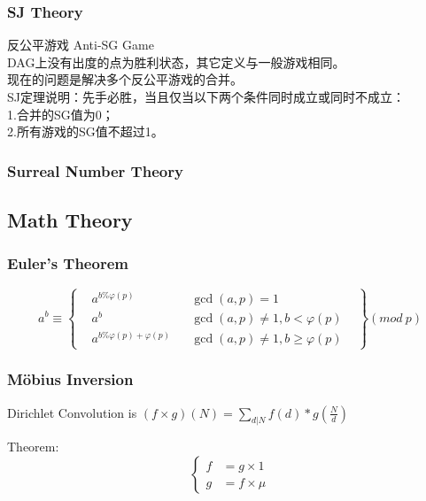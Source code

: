 \documentclass[10pt]{ctexart}
\begin{document}
{{\subsubsection{SJ Theory}
反公平游戏 Anti-SG Game\\
DAG上没有出度的点为胜利状态，其它定义与一般游戏相同。\\
现在的问题是解决多个反公平游戏的合并。\\
SJ定理说明：先手必胜，当且仅当以下两个条件同时成立或同时不成立：\\
1.合并的SG值为0；\\
2.所有游戏的SG值不超过1。\\
\subsubsection{Surreal Number Theory}

\subsection{Math Theory}
\subsubsection{Euler's Theorem}
\begin{equation*}
    a^b\equiv\left\{
    \begin{aligned}
    &a^{b\%\varphi(p)} & & \gcd(a,p)=1&\\
    &a^b & &\gcd(a,p)\not=1,b<\varphi(p) \\
    &a^{b\%\varphi(p) + \varphi(p)} & & \gcd(a,p)\not=1,b\geq \varphi(p) &
    \end{aligned}
    \right\}
    (mod\ p)
\end{equation*}
\subsubsection{Möbius Inversion}
{
Dirichlet Convolution is $(f\times g)(N)=\sum_{d|N} f(d) * g(\frac{N}{d})$
\par
Theorem:
\begin{equation*}
    \left\{
        \begin{aligned} 
            f &= g \times 1 \\
            g &= f \times \mu
        \end{aligned} 
    \right. 
\end{equation*}
}

}}
\end{document}
